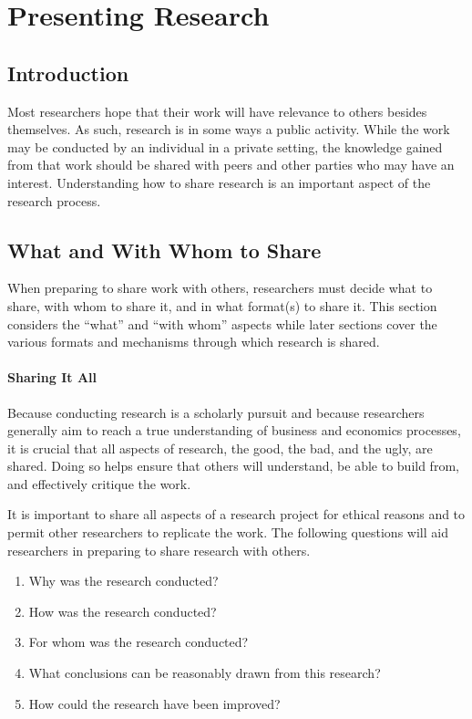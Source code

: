 \chapter{Presenting Research}

\section{Introduction}

Most researchers hope that their work will have relevance to others besides themselves. As such, research is in some ways a public activity. While the work may be conducted by an individual in a private setting, the knowledge gained from that work should be shared with  peers and other parties who may have an interest. Understanding how to share research is an important aspect of the research process.

\section{What and With Whom to Share}

When preparing to share work with others, researchers must decide what to share, with whom to share it, and in what format(s) to share it. This section considers the ``what'' and ``with whom'' aspects while later sections cover the various formats and mechanisms through which research is shared.

\subsubsection{Sharing It All}

Because conducting research is a scholarly pursuit and because researchers generally aim to reach a true understanding of business and economics processes, it is crucial that all aspects of research, the good, the bad, and the ugly, are shared. Doing so helps ensure that others will understand, be able to build from, and effectively critique the work.

It is important to share all aspects of a research project for ethical reasons and to permit other researchers to replicate the work. The following questions will aid researchers in preparing to share research with others.

\begin{enumerate}
	\item Why was the research conducted?
	\item How was the research conducted?
	\item For whom was the research conducted?
	\item What conclusions can be reasonably drawn from this research?
	\item How could the research have been improved?
\end{enumerate}


